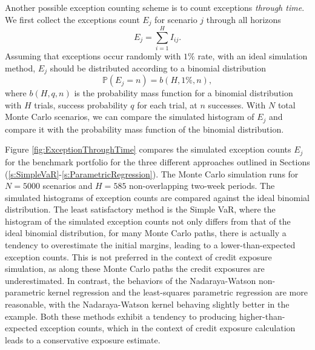 \documentclass[preprint,12pt]{elsarticle}
\begin{document}
Another possible exception counting scheme is to count exceptions \emph{through time}. We first collect the exceptions count $E_j$ for scenario $j$ through all horizons
\begin{equation}
E_{j}=\sum_{i=1}^{H}I_{ij}.
\end{equation}
Assuming that exceptions occur randomly with $1\%$ rate, with an ideal simulation method, $E_j$ should be distributed according to a binomial distribution 
\begin{equation}
\mathbb{P}\left(E_{j}=n\right)=b\left(H,1\%,n\right),
\end{equation}
where $b(H,q,n)$ is the probability mass function for a binomial distribution with $H$ trials, success probability $q$ for each trial, at $n$ successes. With $N$ total Monte Carlo scenarios, we can compare the simulated histogram of $E_j$ and compare it with the probability mass function of the binomial distribution.

Figure \ref{fig:ExceptionThroughTime} compares the simulated exception counts $E_j$ for the benchmark portfolio for the three different approaches outlined in Sections (\ref{s:SimpleVaR}-\ref{s:ParametricRegression}). The Monte Carlo simulation runs for $N=5000$ scenarios and $H=585$ non-overlapping two-week periods. The simulated histograms of exception counts are compared against the ideal binomial distribution. The least satisfactory method is the Simple VaR, where the histogram of the simulated exception counts not only differs from that of the ideal binomial distribution, for many Monte Carlo paths, there is actually a tendency to overestimate the initial margins, leading to a lower-than-expected exception counts. This is not preferred in the context of credit exposure simulation, as along these Monte Carlo paths the credit exposures are underestimated. In contrast, the behaviors of the Nadaraya-Watson non-parametric kernel regression and the least-squares parametric regression are more reasonable, with the Nadaraya-Watson kernel behaving slightly better in the example. Both these methods exhibit a tendency to producing higher-than-expected exception counts, which in the context of credit exposure calculation leads to a conservative exposure estimate.
\end{document}
